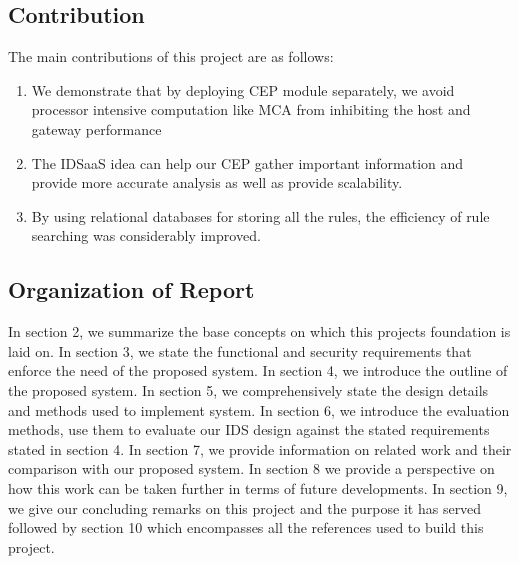 \documentclass[conference]{sig-alternate-05-2015}
\begin{document}
\subsection{Contribution}\label{subsec:contribution}
The main contributions of this project are as follows:
\begin{enumerate}
  \item We demonstrate that by deploying CEP module separately, we avoid processor intensive computation like MCA from inhibiting the host and gateway performance
  \item The IDSaaS idea can help our CEP gather important information and provide more accurate analysis as well as provide scalability.
  \item By using relational databases for storing all the rules, the efficiency of rule searching was considerably improved.
\end{enumerate}

\subsection{Organization of Report}\label{subsec:organization}
In section 2, we summarize the base concepts on which this projects foundation is laid on. In section 3, we state the functional and security requirements that enforce the need of the proposed system. In section 4, we introduce the outline of the proposed system. In section 5, we comprehensively state the design details and methods used to implement system. In section 6, we introduce the evaluation methods, use them to evaluate our IDS design against the stated requirements stated in section 4. In section 7, we provide information on related work and their comparison with our proposed system. In section 8 we provide a perspective on how this work can be taken further in terms of future developments. In section 9, we give our concluding remarks on this project and the purpose it has served followed by section 10 which encompasses all the references used to build this project.
\end{document}
